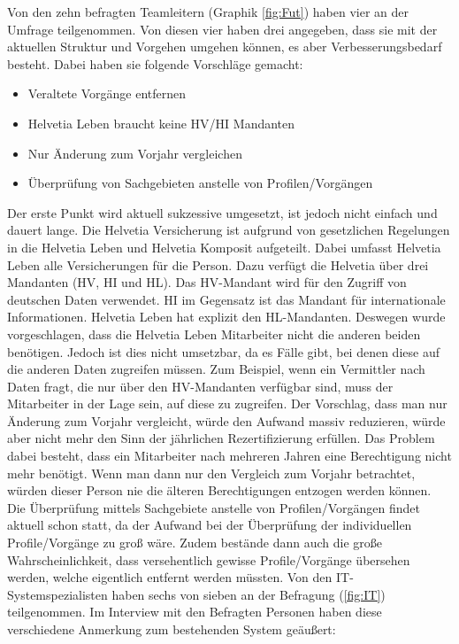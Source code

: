 \newpage
Von den zehn befragten Teamleitern (Graphik \ref{fig:Fut}) haben vier an der Umfrage teilgenommen.
Von diesen vier haben drei angegeben, dass sie mit der aktuellen Struktur und Vorgehen umgehen können, es aber Verbesserungsbedarf besteht.
Dabei haben sie folgende Vorschläge gemacht:

\begin{itemize}
	\item Veraltete Vorgänge entfernen
	\item Helvetia Leben braucht keine HV/HI Mandanten
	\item Nur Änderung zum Vorjahr vergleichen
	\item Überprüfung von Sachgebieten anstelle von Profilen/Vorgängen
\end{itemize}

Der erste Punkt wird aktuell sukzessive umgesetzt, ist jedoch nicht einfach und dauert lange.
Die Helvetia Versicherung ist aufgrund von gesetzlichen Regelungen in die Helvetia Leben und Helvetia Komposit aufgeteilt.
Dabei umfasst Helvetia Leben alle Versicherungen für die Person.
Dazu verfügt die Helvetia über drei Mandanten (HV, HI und HL).
Das HV-Mandant wird für den Zugriff von deutschen Daten verwendet.
HI im Gegensatz ist das Mandant für internationale Informationen.
Helvetia Leben hat explizit den HL-Mandanten.
Deswegen wurde vorgeschlagen, dass die Helvetia Leben Mitarbeiter nicht die anderen beiden benötigen.
Jedoch ist dies nicht umsetzbar, da es Fälle gibt, bei denen diese auf die anderen Daten zugreifen müssen.
Zum Beispiel, wenn ein Vermittler nach Daten fragt, die nur über den HV-Mandanten verfügbar sind, muss der Mitarbeiter in der Lage sein, auf diese zu zugreifen.
\newline
Der Vorschlag, dass man nur Änderung zum Vorjahr vergleicht, würde den Aufwand massiv reduzieren, würde aber nicht mehr den Sinn der jährlichen Rezertifizierung erfüllen.
Das Problem dabei besteht, dass ein Mitarbeiter nach mehreren Jahren eine Berechtigung nicht mehr benötigt.
Wenn man dann nur den Vergleich zum Vorjahr betrachtet, würden dieser Person nie die älteren Berechtigungen entzogen werden können.
\newline
Die Überprüfung mittels Sachgebiete anstelle von Profilen/Vorgängen findet aktuell schon statt, da der Aufwand bei der Überprüfung der individuellen Profile/Vorgänge zu groß wäre.
Zudem bestände dann auch die große Wahrscheinlichkeit, dass versehentlich gewisse Profile/Vorgänge übersehen werden, welche eigentlich entfernt werden müssten.
\newline
\newline
Von den IT-Systemspezialisten haben sechs von sieben an der Befragung (\ref{fig:IT}) teilgenommen.
Im Interview mit den Befragten Personen haben diese verschiedene Anmerkung zum bestehenden System geäußert:


